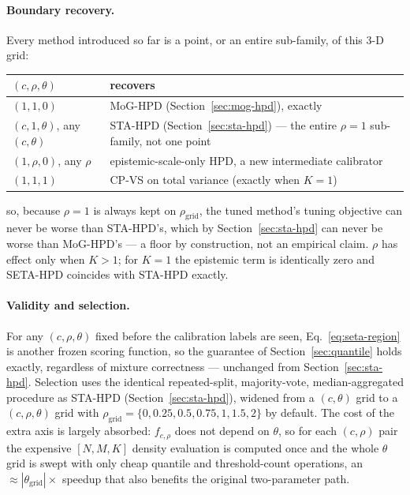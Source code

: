 \documentclass[11pt]{article}
\begin{document}
\paragraph{Boundary recovery.} Every method introduced so far is a point, or an entire
sub-family, of this 3-D grid:
\begin{center}
\begin{tabular}{@{}ll@{}}
\toprule
$(c,\rho,\theta)$ & recovers \\
\midrule
$(1,1,0)$ & MoG-HPD (Section~\ref{sec:mog-hpd}), exactly \\
$(c,1,\theta)$, any $(c,\theta)$ & STA-HPD (Section~\ref{sec:sta-hpd}) --- the entire $\rho=1$
sub-family, not one point \\
$(1,\rho,0)$, any $\rho$ & epistemic-scale-only HPD, a new intermediate calibrator \\
$(1,1,1)$ & CP-VS on total variance (exactly when $K=1$) \\
\bottomrule
\end{tabular}
\end{center}
so, because $\rho=1$ is always kept on $\rho_{\mathrm{grid}}$, the tuned method's tuning objective
can never be worse than STA-HPD's, which by Section~\ref{sec:sta-hpd} can never be worse than
MoG-HPD's --- a floor by construction, not an empirical claim. $\rho$ has effect only when $K>1$;
for $K=1$ the epistemic term is identically zero and SETA-HPD coincides with STA-HPD exactly.

\paragraph{Validity and selection.} For any $(c,\rho,\theta)$ fixed before the calibration labels
are seen, Eq.~\eqref{eq:seta-region} is another frozen scoring function, so the guarantee of
Section~\ref{sec:quantile} holds exactly, regardless of mixture correctness --- unchanged from
Section~\ref{sec:sta-hpd}. Selection uses the identical repeated-split, majority-vote,
median-aggregated procedure as STA-HPD (Section~\ref{sec:sta-hpd}), widened from a $(c,\theta)$
grid to a $(c,\rho,\theta)$ grid with $\rho_{\mathrm{grid}}=\{0,0.25,0.5,0.75,1,1.5,2\}$ by
default. The cost of the extra axis is largely absorbed: $f_{c,\rho}$ does not depend on $\theta$,
so for each $(c,\rho)$ pair the expensive $[N,M,K]$ density evaluation is computed once and the
whole $\theta$ grid is swept with only cheap quantile and threshold-count operations, an
$\approx|\theta_{\mathrm{grid}}|\times$ speedup that also benefits the original two-parameter
path.
\end{document}
